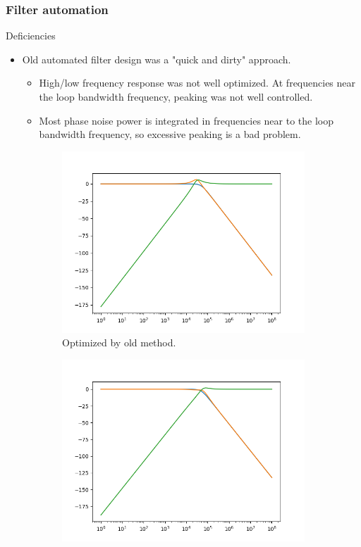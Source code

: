 \documentclass[t, screen, aspectratio=43]{beamer}
\begin{document}
\begin{frame}
	\frametitle{Filter automation}
	\begin{block}{Deficiencies}
		\begin{itemize}
			\scriptsize
			\item Old automated filter design was a "quick and dirty" approach. 
			\begin{itemize}
				\scriptsize
				\item High/low frequency response was not well optimized. At frequencies near the loop bandwidth frequency, peaking was not well controlled.
				\item Most phase noise power is integrated in frequencies near to the loop bandwidth frequency, so excessive peaking is a bad problem.
			\end{itemize}	
		\end{itemize} 
		\vspace{-1em}
		\begin{figure}[htb!]
	        \centering
	        \begin{subfigure}{.4\textwidth}
	            \centering
	            \includegraphics[width=0.9\linewidth]{old_g.png}
	            \caption{\scriptsize Optimized by old method.}
	            \label{fig:rosc_3stg_cir}
	        \end{subfigure}%
	        \begin{subfigure}{.4\textwidth}
	            \centering
	            \includegraphics[width=0.9\linewidth]{better_g.png}

\end{subfigure}
\end{figure}
\end{block}
\end{frame}
\end{document}
